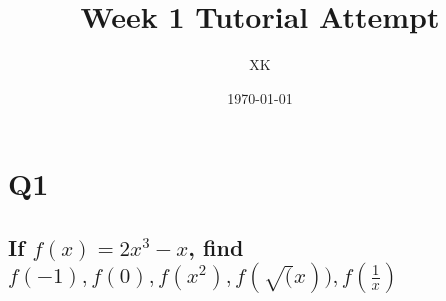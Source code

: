 \documentclass{article}
\title{Week 1 Tutorial Attempt}
\author{XK}
\date{\today}
\begin{document}
\maketitle

\tableofcontents

\section{Q1}

\subsection*{If $f(x) = 2x^3-x$, find $f(-1),f(0),f(x^2),f(\sqrt(x)), f(\frac{1}{x})$}
\end{document}
